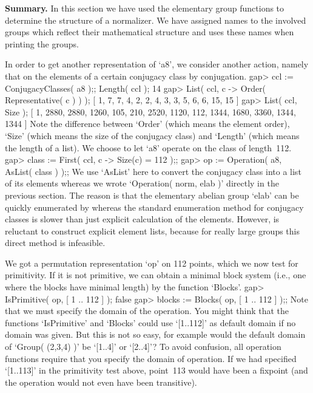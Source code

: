 {\bf Summary.}   In  this section   we have   used   the elementary group
functions to determine  the structure of  a normalizer. We have  assigned
names  to the involved groups which  reflect their mathematical structure
and {\GAP} uses these names when printing the groups.


In  order to get  another  representation  of  `a8', we consider  another
action, namely  that on  the elements   of a  certain conjugacy  class by
conjugation.
\beginexample
    gap> ccl := ConjugacyClasses( a8 );; Length( ccl );
    14
    gap> List( ccl, c -> Order( Representative( c ) ) );
    [ 1, 7, 7, 4, 2, 2, 4, 3, 3, 5, 6, 6, 15, 15 ]
    gap> List( ccl, Size );
    [ 1, 2880, 2880, 1260, 105, 210, 2520, 1120, 112, 1344, 1680, 3360,
      1344, 1344 ]
\endexample
Note  the  difference between `Order'  (which   means the element order),
`Size' (which means the size of the conjugacy  class) and `Length' (which
means the length of  a list). We choose to  let `a8' operate on the class
of length~112.
\beginexample
    gap> class := First( ccl, c -> Size(c) = 112 );;
    gap> op := Operation( a8, AsList( class ) );;
\endexample
We use `AsList' here  to convert the conjugacy class  into a list  of its
elements whereas we   wrote  `Operation( norm,  elab )'   directly in the
previous section. The reason is that  the elementary abelian group `elab'
can  be quickly enumerated by   {\GAP}  whereas the standard  enumeration
method for conjugacy classes is  slower than just explicit calculation of
the elements. However, {\GAP} is reluctant  to construct explicit element
lists, because for really large groups this direct method is infeasible.

We got a permutation representation `op' on 112 points, which we now test
for primitivity. If  it is not primitive, we  can obtain  a minimal block
system (i.e., one where the  blocks have minimal  length) by the function
`Blocks'.
\beginexample
    gap> IsPrimitive( op, [ 1 .. 112 ] );
    false
    gap> blocks := Blocks( op, [ 1 .. 112 ] );;
\endexample
Note that we  must specify the domain  of the operation. You  might think
that the   functions `IsPrimitive' and `Blocks'  could  use `[1..112]' as
default  domain if no  domain was  given. But  this  is not so  easy, for
example  would the default domain  of `Group(  (2,3,4)  )' be `[1..4]' or
`[2..4]'? To  avoid confusion, all operation  functions  require that you
specify  the domain of operation. If  we had specified  `[1..113]' in the
primitivity test above,  point~113  would have been  a fixpoint  (and the
operation would not even have been transitive).

